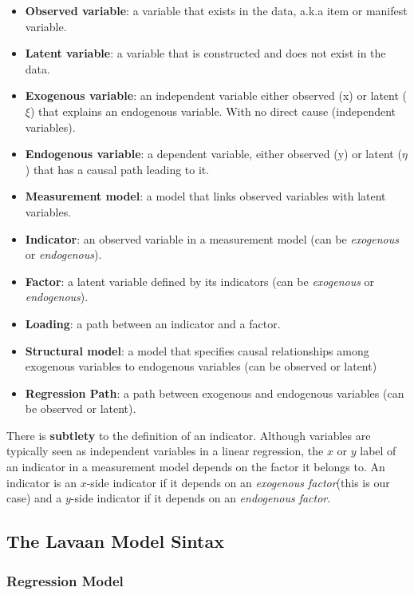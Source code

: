 \documentclass[
]{article}
\begin{document}
\begin{itemize}
\item
  \textbf{Observed variable}: a variable that exists in the data, a.k.a
  item or manifest variable.
\item
  \textbf{Latent variable}: a variable that is constructed and does not
  exist in the data.
\item
  \textbf{Exogenous variable}: an independent variable either observed
  (x) or latent (\(\xi\)) that explains an endogenous variable. With no
  direct cause (independent variables).
\item
  \textbf{Endogenous variable}: a dependent variable, either observed
  (y) or latent (\(\eta\)) that has a causal path leading to it.
\item
  \textbf{Measurement model}: a model that links observed variables with
  latent variables.
\item
  \textbf{Indicator}: an observed variable in a measurement model (can
  be \emph{exogenous} or \emph{endogenous}).
\item
  \textbf{Factor}: a latent variable defined by its indicators (can be
  \emph{exogenous} or \emph{endogenous}).
\item
  \textbf{Loading}: a path between an indicator and a factor.
\item
  \textbf{Structural model}: a model that specifies causal relationships
  among exogenous variables to endogenous variables (can be observed or
  latent)
\item
  \textbf{Regression Path}: a path between exogenous and endogenous
  variables (can be observed or latent).
\end{itemize}

There is \textbf{subtlety} to the definition of an indicator. Although
variables are typically seen as independent variables in a linear
regression, the \(x\) or \(y\) label of an indicator in a measurement
model depends on the factor it belongs to. An indicator is an \(x\)-side
indicator if it depends on an \emph{exogenous factor}(this is our case)
and a \(y\)-side indicator if it depends on an \emph{endogenous factor}.

\hypertarget{the-lavaan-model-sintax}{%
\subsection{The Lavaan Model Sintax}\label{the-lavaan-model-sintax}}

\hypertarget{regression-model}{%
\subsubsection{Regression Model}\label{regression-model}}
\end{document}
